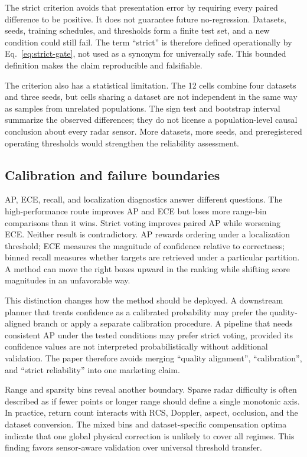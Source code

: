 \documentclass[preprint,12pt,times]{elsarticle}
\begin{document}
The strict criterion avoids that presentation error by requiring every paired
difference to be positive. It does not guarantee future no-regression.
Datasets, seeds, training schedules, and thresholds form a finite test set,
and a new condition could still fail. The term ``strict'' is therefore defined
operationally by Eq.~\eqref{eq:strict-gate}, not used as a synonym for
universally safe. This bounded definition makes the claim reproducible and
falsifiable.

The criterion also has a statistical limitation. The 12 cells combine four
datasets and three seeds, but cells sharing a dataset are not independent in
the same way as samples from unrelated populations. The sign test and
bootstrap interval summarize the observed differences; they do not license a
population-level causal conclusion about every radar sensor. More datasets,
more seeds, and preregistered operating thresholds would strengthen the
reliability assessment.

\subsection{Calibration and failure boundaries}

AP, ECE, recall, and localization diagnostics answer different questions. The
high-performance route improves AP and ECE but loses more range-bin comparisons
than it wins. Strict voting improves paired AP while worsening ECE. Neither
result is contradictory. AP rewards ordering under a localization threshold;
ECE measures the magnitude of confidence relative to correctness; binned
recall measures whether targets are retrieved under a particular partition.
A method can move the right boxes upward in the ranking while shifting score
magnitudes in an unfavorable way.

This distinction changes how the method should be deployed. A downstream
planner that treats confidence as a calibrated probability may prefer the
quality-aligned branch or apply a separate calibration procedure. A pipeline
that needs consistent AP under the tested conditions may prefer strict voting,
provided its confidence values are not interpreted probabilistically without
additional validation. The paper therefore avoids merging ``quality
alignment'', ``calibration'', and ``strict reliability'' into one marketing
claim.

Range and sparsity bins reveal another boundary. Sparse radar difficulty is
often described as if fewer points or longer range should define a single
monotonic axis. In practice, return count interacts with RCS, Doppler, aspect,
occlusion, and the dataset conversion. The mixed bins and dataset-specific
compensation optima indicate that one global physical correction is unlikely
to cover all regimes. This finding favors sensor-aware validation over
universal threshold transfer.
\end{document}
